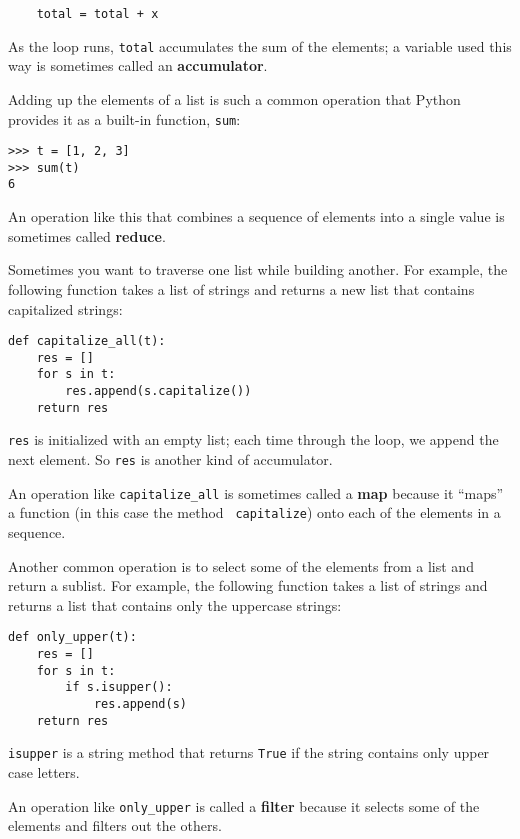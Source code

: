 \documentclass[10pt]{book}
\begin{document}
\begin{verbatim}
    total = total + x
\end{verbatim}
%
As the loop runs, {\tt total} accumulates the sum of the
elements; a variable used this way is sometimes called an
{\bf accumulator}.

Adding up the elements of a list is such a common operation
that Python provides it as a built-in function, {\tt sum}:

\begin{verbatim}
>>> t = [1, 2, 3]
>>> sum(t)
6
\end{verbatim}
%
An operation like this that combines a sequence of elements into
a single value is sometimes called {\bf reduce}.

Sometimes you want to traverse one list while building
another.  For example, the following function takes a list of strings
and returns a new list that contains capitalized strings:

\begin{verbatim}
def capitalize_all(t):
    res = []
    for s in t:
        res.append(s.capitalize())
    return res
\end{verbatim}
%
{\tt res} is initialized with an empty list; each time through
the loop, we append the next element.  So {\tt res} is another
kind of accumulator.

An operation like \verb"capitalize_all" is sometimes called a {\bf
map} because it ``maps'' a function (in this case the method {\tt
capitalize}) onto each of the elements in a sequence.

Another common operation is to select some of the elements from
a list and return a sublist.  For example, the following
function takes a list of strings and returns a list that contains
only the uppercase strings:

\begin{verbatim}
def only_upper(t):
    res = []
    for s in t:
        if s.isupper():
            res.append(s)
    return res
\end{verbatim}
%
{\tt isupper} is a string method that returns {\tt True} if
the string contains only upper case letters.

An operation like \verb"only_upper" is called a {\bf filter} because
it selects some of the elements and filters out the others.
\end{document}
